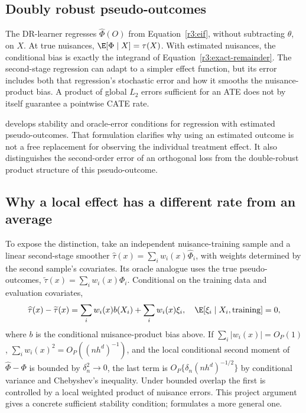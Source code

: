 \subsection{Doubly robust pseudo-outcomes}
The DR-learner regresses $\widehat\Phi(O)$ from
Equation~\eqref{r3:eif}, without subtracting $\theta$, on $X$.
At true nuisances, $\E[\Phi\mid X]=\tau(X)$. With estimated nuisances,
the conditional bias is exactly the integrand of
Equation~\eqref{r3:exact-remainder}. The second-stage regression can
adapt to a simpler effect function, but its error includes both that
regression's stochastic error and how it smooths the nuisance-product
bias. A product of global $L_2$ errors sufficient for an ATE does not
by itself guarantee a pointwise CATE rate.

\citet[Sections 3--4]{drlearner2023} develops stability and oracle-error
conditions for regression with estimated pseudo-outcomes. That formulation
clarifies why using an estimated outcome is not a free replacement for
observing the individual treatment effect. It also distinguishes the
second-order error of an orthogonal loss from the double-robust product
structure of this pseudo-outcome.

\subsection{Why a local effect has a different rate from an average}
\label{r3:cate-rates}
To expose the distinction, take an independent nuisance-training sample
and a linear second-stage smoother
$\widehat\tau(x)=\sum_iw_i(x)\widehat\Phi_i$, with weights determined
by the second sample's covariates. Its oracle analogue uses the true
pseudo-outcomes, $\widetilde\tau(x)=\sum_iw_i(x)\Phi_i$.
Conditional on the training data and evaluation covariates,
\[
 \widehat\tau(x)-\widetilde\tau(x)
 =\sum_iw_i(x)b(X_i)+\sum_iw_i(x)\xi_i,
 \quad \E[\xi_i\mid X_i,\text{training}]=0,
\]
where $b$ is the conditional nuisance-product bias above. If
$\sum_i|w_i(x)|=O_P(1)$,
$\sum_iw_i(x)^2=O_P((nh^d)^{-1})$, and the local conditional
second moment of $\widehat\Phi-\Phi$ is bounded by $\delta_n^2\to0$,
the last term is $O_P\{\delta_n(nh^d)^{-1/2}\}$ by conditional
variance and Chebyshev's inequality. Under bounded overlap the first
is controlled by a local weighted product of nuisance errors. This
project argument gives a concrete sufficient stability condition;
\citet[Theorem 2]{drlearner2023} formulates a more general one.


